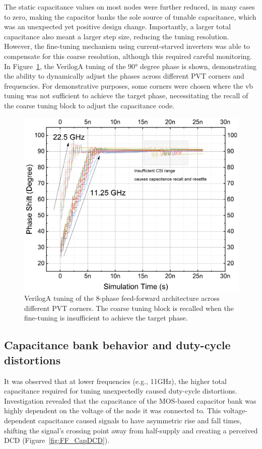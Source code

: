 The static capacitance values on most nodes were further reduced, in many cases to zero, making the capacitor banks the sole source of tunable capacitance, which was an unexpected yet positive design change. Importantly, a larger total capacitance also meant a larger step size, reducing the tuning resolution. However, the fine-tuning mechanism using current-starved inverters was able to compensate for this coarse resolution, although this required careful monitoring. In Figure~\ref{fig:FF_8out_CSI_dynamicTuning_PVT}, the VerilogA tuning of the \ang{90} degree phase is shown, demonstrating the ability to dynamically adjust the phases across different PVT corners and frequencies. For demonstrative purposes, some corners were chosen where the vb tuning was not sufficient to achieve the target phase, necessitating the recall of the coarse tuning block to adjust the capacitance code.

\begin{figure}[H]
  \centering
  \includegraphics[width=0.8\linewidth]{figures/Results/FF_8out_3nm_idealswitches-Phase90_tuning_PVT_SomeN.png}
  \caption{VerilogA tuning of the 8-phase feed-forward architecture across different PVT corners. The coarse tuning block is recalled when the fine-tuning is insufficient to achieve the target phase.}
  \label{fig:FF_8out_CSI_dynamicTuning_PVT}
\end{figure}

\subsection{Capacitance bank behavior and duty-cycle distortions}

It was observed that at lower frequencies (e.g., 11GHz), the higher total capacitance required for tuning unexpectedly caused duty-cycle distortions. Investigation revealed that the capacitance of the MOS-based capacitor bank was highly dependent on the voltage of the node it was connected to. This voltage-dependent capacitance caused signals to have asymmetric rise and fall times, shifting the signal's crossing point away from half-supply and creating a perceived DCD (Figure~\ref{fig:FF_CapDCD}).

